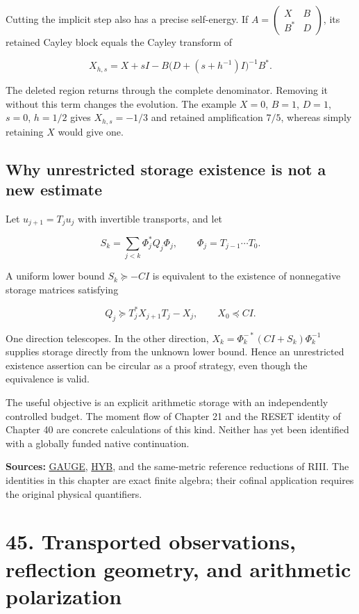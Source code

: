 \documentclass[
  10pt,
  a4paper,
  10pt,
  oneside,
  openany]{book}
\begin{document}
Cutting the implicit step also has a precise self-energy. If
\(A=\left(\begin{smallmatrix}X&B\\B^{*}&D\end{smallmatrix}\right)\), its
retained Cayley block equals the Cayley transform of

\[
 X_{h,s}=X+sI-B\bigl(D+(s+h^{-1})I\bigr)^{-1}B^{*}.
 \tag{44.5}\label{eq:44.5}
\]

The deleted region returns through the complete denominator. Removing it
without this term changes the evolution. The example \(X=0\), \(B=1\),
\(D=1\), \(s=0\), \(h=1/2\) gives \(X_{h,s}=-1/3\) and retained
amplification \(7/5\), whereas simply retaining \(X\) would give one.

\subsection{Why unrestricted storage existence is not a new
estimate}\label{why-unrestricted-storage-existence-is-not-a-new-estimate}

Let \(u_{j+1}=T_ju_j\) with invertible transports, and let

\[
 S_k=\sum_{j<k}\Phi_j^{*}Q_j\Phi_j,
 \qquad \Phi_j=T_{j-1}\cdots T_0.
\]

A uniform lower bound \(S_k\succeq-CI\) is equivalent to the existence
of nonnegative storage matrices satisfying

\[
 Q_j\succeq T_j^{*}X_{j+1}T_j-X_j,
 \qquad X_0\preceq CI.
 \tag{44.6}\label{eq:44.6}
\]

One direction telescopes. In the other direction,
\(X_k=\Phi_k^{-*}(CI+S_k)\Phi_k^{-1}\) supplies storage directly from
the unknown lower bound. Hence an unrestricted existence assertion can
be circular as a proof strategy, even though the equivalence is valid.

The useful objective is an explicit arithmetic storage with an
independently controlled budget. The moment flow of Chapter 21 and the
RESET identity of Chapter 40 are concrete calculations of this kind.
Neither has yet been identified with a globally funded native
continuation.

\textbf{Sources:} \hyperref[source-gauge]{GAUGE},
\hyperref[source-hyb]{HYB}, and the same-metric reference reductions of
RIII. The identities in this chapter are exact finite algebra; their
cofinal application requires the original physical quantifiers.

\section{45. Transported observations, reflection geometry, and
arithmetic polarization}\label{ch-crossfields}
\end{document}
